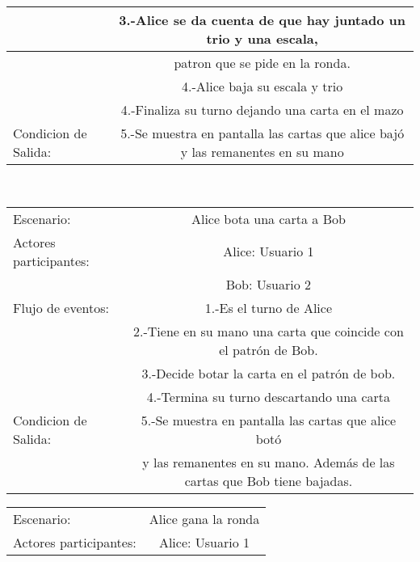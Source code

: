 \begin{center}
\begin{tabular}{ l | c  }
                                         & 3.-Alice se da cuenta de que hay juntado un trio y una escala, \\\hline
                                         &patron que se pide en la ronda. \\\hline
                                         & 4.-Alice baja su escala y trio                   \\\hline
                                         & 4.-Finaliza su turno dejando una carta en el mazo             \\\hline
        Condicion de Salida:             & 5.-Se muestra en pantalla las cartas que alice bajó y las remanentes en su mano                   \\\hline
        \hline
    \end{tabular}
    \\
    \begin{tabular}{ l | c  }
        Escenario:            & Alice bota una carta a Bob\\
        Actores participantes: & Alice: Usuario  1                                              \\\hline
                                         & Bob: Usuario  2                                              \\\hline
        Flujo de eventos:                & 1.-Es el turno de Alice                                 \\
                                         & 2.-Tiene en su mano una carta que coincide con el patrón de Bob.\\\hline
                                         & 3.-Decide botar la carta en el patrón de bob. \\\hline
                                         & 4.-Termina su turno descartando una carta               \\\hline
        Condicion de Salida:             & 5.-Se muestra en pantalla las cartas que alice botó\\\hline
                                            & y las remanentes en su mano. Además de las cartas que Bob tiene bajadas.             \\\hline
        \hline
    \end{tabular}
    \begin{tabular}{ l | c  }
        Escenario:            & Alice gana la ronda\\
        Actores participantes: & Alice: Usuario  1                                              \\\hline

\end{tabular}
\end{center}
